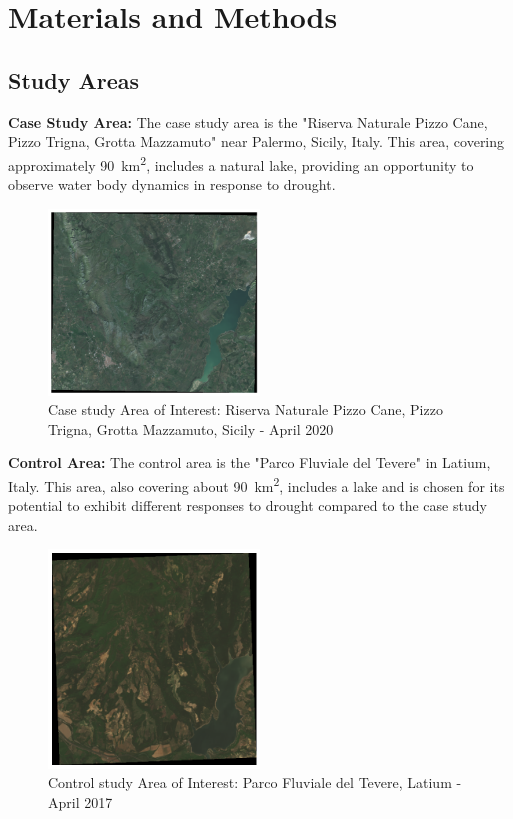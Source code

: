 \documentclass[10pt,twocolumn]{article}
\begin{document}
\section{Materials and Methods}
\subsection{Study Areas}

\textbf{Case Study Area:} The case study area is the "Riserva Naturale Pizzo Cane, Pizzo Trigna, Grotta Mazzamuto" near Palermo, Sicily, Italy. This area, covering approximately \SI{90}{\kilo\meter\squared}, includes a natural lake, providing an opportunity to observe water body dynamics in response to drought.

\begin{figure}
  \centering
  \includegraphics[width=0.5\textwidth]{images/case_palermo_april_2020_rgb.png}
  \caption{Case study Area of Interest: Riserva Naturale Pizzo Cane, Pizzo Trigna, Grotta Mazzamuto, Sicily - April 2020}
  \label{fig:case_rgb}
\end{figure}

\textbf{Control Area:} The control area is the "Parco Fluviale del Tevere" in Latium, Italy. This area, also covering about \SI{90}{\kilo\meter\squared}, includes a lake and is chosen for its potential to exhibit different responses to drought compared to the case study area.

\begin{figure}
  \centering
  \includegraphics[width=0.5\textwidth]{images/control_tevere_april_2017_rgb.png}
  \caption{Control study Area of Interest: Parco Fluviale del Tevere, Latium - April 2017}
  \label{fig:control_rgb}
\end{figure}
\end{document}
